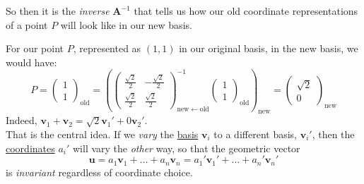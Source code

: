 	
	So then it is the \emph{inverse} $\mathbf A^{-1}$ that tells us how our old coordinate representations of a point $P$ will look like in our new basis.
	
	For our point $P$, represented as $(1,1)$ in our original basis, in the new basis, we would have:
	\begin{equation*}
		P = \begin{pmatrix}
			1 \\ 1
		\end{pmatrix}_{\mathrm{old}}
		= \left( \begin{pmatrix}
			 \frac{\sqrt 2}{2} &  -\frac{\sqrt 2}{2} \\
			 \frac{\sqrt 2}{2} &  \frac{\sqrt 2}{2}
		\end{pmatrix}^{-1}_{\mathrm{new} \leftarrow \mathrm{old}} 		\begin{pmatrix}
			1 \\ 1
		\end{pmatrix}_{\mathrm{old}}\right)_\mathrm{new}
		= \begin{pmatrix}
			\sqrt 2 \\ 0
		\end{pmatrix}_{\mathrm{new}}
	\end{equation*}
	Indeed, $\mathbf v_1 + \mathbf v_2 = \sqrt 2 \mathbf v_1' + 0 \mathbf v_2'$.\\
	
	That is the central idea. If we \emph{vary} the \underline{basis} $\mathbf v_i$ to a different basis, $\mathbf v_i'$, then the \underline{coordinates} $a_i'$ will vary  the \emph{other} way, so that the geometric vector
	\begin{equation*}
		\mathbf u = a_1 \mathbf v_1 + \dots + a_n \mathbf v_n = a_1' \mathbf v_1' + \dots + a_n' \mathbf v_n'
	\end{equation*} is \emph{invariant} regardless of coordinate choice.
	

